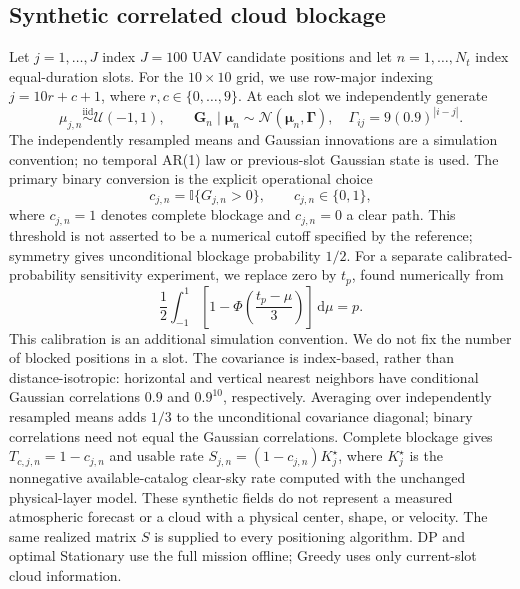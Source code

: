 \subsection{Synthetic correlated cloud blockage}
Let $j=1,\ldots,J$ index $J=100$ UAV candidate positions and let
$n=1,\ldots,N_t$ index equal-duration slots. For the $10\times10$ grid,
we use row-major indexing $j=10r+c+1$, where $r,c\in\{0,\ldots,9\}$.
At each slot we independently generate
\begin{equation}
 \mu_{j,n}\overset{\mathrm{iid}}{\sim}\mathcal U(-1,1),\qquad
 \mathbf G_n\mid\boldsymbol\mu_n\sim\mathcal N(\boldsymbol\mu_n,\boldsymbol\Gamma),
 \quad \Gamma_{ij}=9(0.9)^{|i-j|}.
 \label{eq:phasec_cloud_gaussian}
\end{equation}
The independently resampled means and Gaussian innovations are a simulation
convention; no temporal AR(1) law or previous-slot Gaussian state is used.
The primary binary conversion is the explicit operational choice
\begin{equation}
 c_{j,n}=\mathbb I\{G_{j,n}>0\},\qquad c_{j,n}\in\{0,1\},
 \label{eq:phasec_cloud_threshold}
\end{equation}
where $c_{j,n}=1$ denotes complete blockage and $c_{j,n}=0$ a clear path.
This threshold is not asserted to be a numerical cutoff specified by the
reference; symmetry gives unconditional blockage probability $1/2$.
For a separate calibrated-probability sensitivity experiment, we replace
zero by $t_p$, found numerically from
\begin{equation}
 \frac12\int_{-1}^{1}\left[1-\Phi\!\left(\frac{t_p-\mu}{3}\right)\right]
 \,\mathrm d\mu=p.
 \label{eq:phasec_cloud_calibration}
\end{equation}
This calibration is an additional simulation convention. We do not fix the
number of blocked positions in a slot. The covariance is index-based, rather
than distance-isotropic: horizontal and vertical nearest neighbors have
conditional Gaussian correlations $0.9$ and $0.9^{10}$, respectively. Averaging
over independently resampled means adds $1/3$ to the unconditional covariance
diagonal; binary correlations need not equal the Gaussian correlations.
Complete blockage gives $T_{c,j,n}=1-c_{j,n}$ and usable rate
$S_{j,n}=(1-c_{j,n})K_j^\star$, where $K_j^\star$ is the nonnegative
available-catalog clear-sky rate computed with the unchanged physical-layer
model. These synthetic fields do not represent a measured atmospheric forecast
or a cloud with a physical center, shape, or velocity. The same realized matrix
$S$ is supplied to every positioning algorithm. DP and optimal Stationary
use the full mission offline; Greedy uses only current-slot cloud information.
